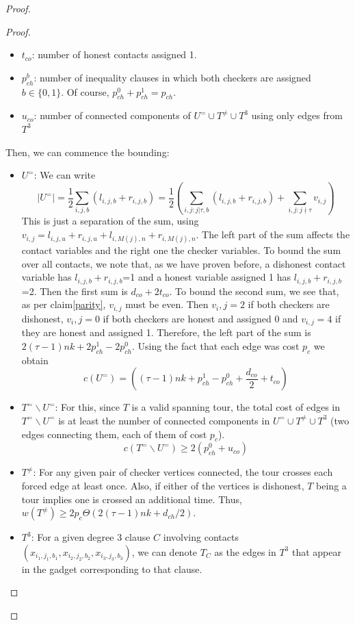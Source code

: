 \documentclass[12pt]{article}
\begin{document}
\begin{proof}
\begin{proof}
\begin{itemize}
        \item $t_{co}$: number of honest contacts assigned 1. 
        \item $p^b_{ch}$: number of inequality clauses in which both checkers are assigned 
        $b\in\{0,1\}$. Of course, $p^0_{ch}+p^1_{ch}= p_{ch}$.
        \item $u_{co}$: number of connected components of $U^=\cup T^{\not =}\cup T^3$ using only edges from $T^3$
    \end{itemize}
    Then, we can commence the bounding:
    \begin{itemize}
        \item \textbf{$U^=$}: We can write \[|U^=|=\frac{1}{2} \sum\limits_{i,j,b} (l_{i,j,b} + r_{i,j,b}) = \frac{1}{2} \left( \sum\limits_{i,j : j|\tau,b} (l_{i,j,b} + r_{i,j,b}) + \sum\limits_{i,j : j \nmid \tau} v_{i,j} \right)\]
        This is just a separation of the sum, using $v_{i,j}=l_{i,j,u}+r_{i,j,u}+l_{i,M(j),n}+r_{i,M(j),n}$. The left part of the sum affects the contact variables and the right one the checker variables. 
        To bound the sum over all contacts, we note that, as we have proven before, a dishonest contact variable has $l_{i,j,b}+r_{i,j,b}$=1 and a honest variable assigned 1 has $l_{i,j,b}+r_{i,j,b}$=2. Then the first sum is $d_{co}+2t_{co}$.
        To bound the second sum, we see that, as per claim\ref{parity}, $v_{i,j}$ must be even. Then $v_i,j=2$ if both checkers are dishonest, $v_i,j=0$ if both checkers are honest and assigned 0 and $v_{i,j}=4$ if they are honest and assigned 1. 
        Therefore, the left part of the sum is $2(\tau-1)nk+2p^1_{ch}-2p^0_{ch}$. 
        Using the fact that each edge was cost $p_c$ we obtain 
        \[c(U^=)=((\tau-1)nk+p^1_{ch}-p^0_{ch}+\frac{d_{co}}{2}+t_{co})\]
        \item \textbf{$T^=\backslash U^=$}: For this, since $T$ is a valid spanning tour, the total cost of edges in $T^=\backslash U^=$ is at least the number of connected components in  $U^=\cup T^{\not =}\cup T^3$ (two edges connecting them, each of them of cost $p_c$). 
        \[c(T^=\backslash U^=)\geq 2 (p^0_{ch}+u_{co})\]
        \item \textbf{$T^{\not =}$}: For any given pair of checker vertices connected, the tour crosses each forced edge at least once. Also, if either of the vertices is dishonest, $T$ being a tour implies one is crossed an additional time. 
        Thus, $w(T^{\not=})\geq 2p_c\Theta (2(\tau-1)nk+d_{ch}/2)$.
        \item \textbf{$T^3$}: For a given degree 3 clause $C$ involving contacts $(x_{i_1,j_1,b_1}, x_{i_2,j_2,b_2}, x_{i_3,j_3,b_3})$, we can denote $T_C$ as the edges in $T^3$ that appear in the gadget corresponding to that clause. 

\end{itemize}
\end{proof}
\end{proof}
\end{document}
